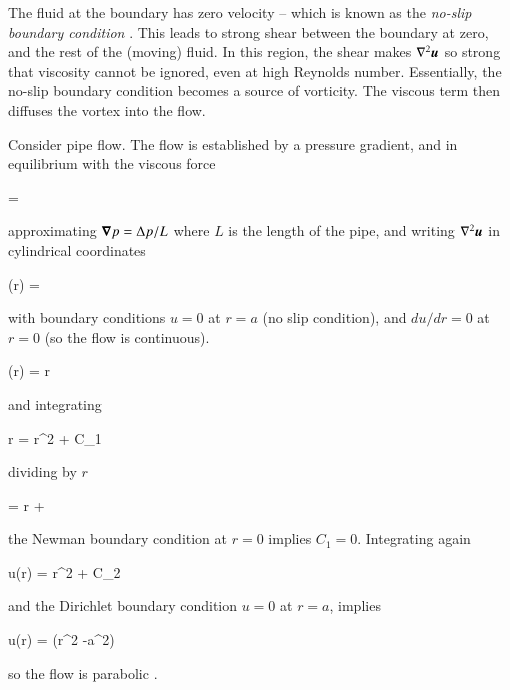 The fluid at the boundary has zero velocity -- which is known as the {\it no-slip boundary
  condition} . This leads to strong shear between the boundary at zero,
and the rest of the (moving) fluid. In this region, the shear makes
$\nabla^2{{\boldsymbol{u}}}$ so strong that viscosity cannot be ignored, even at high
Reynolds number. Essentially, the no-slip boundary condition becomes a
source of vorticity. The viscous term then diffuses the vortex into
the flow. 


Consider pipe flow. The flow is established by a pressure gradient,
and in equilibrium with the viscous force

\beq
\mu{}= 
\eeq

\noindent approximating ${\boldsymbol{\nabla}}{p}=\Delta p / L$ where $L$ is the length of the
pipe, and writing $\nabla^2{{\boldsymbol{u}}}$ in cylindrical coordinates 

\beq
{}\left(r\right) = 
\eeq

\noindent with boundary conditions $u=0$ at $r=a$ (no slip condition), and
$du/dr=0$ at $r=0$ (so the flow is continuous).

\beq
{}\left(r\right) = r
\eeq

\noindent and integrating 

\beq
r = r^2 + C_1
\eeq

\noindent dividing by $r$

\beq
{} = r + 
\eeq

\noindent the Newman boundary condition at $r=0$ implies $C_1=0$. Integrating again

\beq
u(r) = r^2 + C_2 
\eeq

\noindent and the Dirichlet boundary condition $u=0$ at $r=a$, implies 

\beq
u(r) = \left(r^2 -a^2\right)
\eeq

\noindent so the flow is parabolic .

